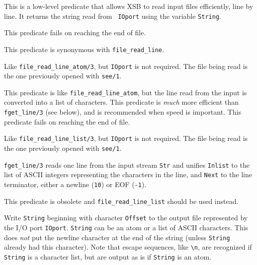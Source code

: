 \begin{description}
    This is a low-level predicate that allows XSB to read input files
    efficiently, line by line. It returns the string read from {\tt
      IOport} using the variable {\tt String}.

    This predicate fails on reaching the end of file.
    
    This predicate is synonymous with \verb|file_read_line|.
    
   Like \verb|file_read_line_atom/3|, but {\tt IOport} is not required.
   The file being read is the one previously opened with {\tt see/1}.

    This predicate is like \verb|file_read_line_atom|, but the line read from
    the input is converted into a list of characters.
    This predicate is \emph{much} more efficient than {{\tt fget\_line/3}}
    (see below), and is recommended when speed is important.
    This predicate fails on reaching the end of file.

   Like \verb|file_read_line_list/3|, but {\tt IOport} is not required.
   The file being read is the one previously opened with {\tt see/1}.

    {\tt fget\_line/3} reads one line from the input stream {\tt Str} and
    unifies {\tt Inlist} to the list of ASCII integers representing the
    characters in the line, and {\tt Next} to the line terminator, either
    a newline ({\tt 10}) or EOF ({\tt-1}).
    
    This predicate is obsolete and
    \verb|file_read_line_list| should be used instead.

   Write {\tt String} beginning with character {\tt Offset}  to the output
   file represented by the I/O port {\tt IOport}. {\tt String} can
   be an atom or a list of ASCII characters. This does \emph{not} put the
   newline character at the end of the string (unless {\tt String} already
   had this character). Note that escape sequences, like \verb|\n|, are
   recognized if {\tt String} is a character list, but are output as is if
   {\tt String} is an atom.
   

\end{description}
